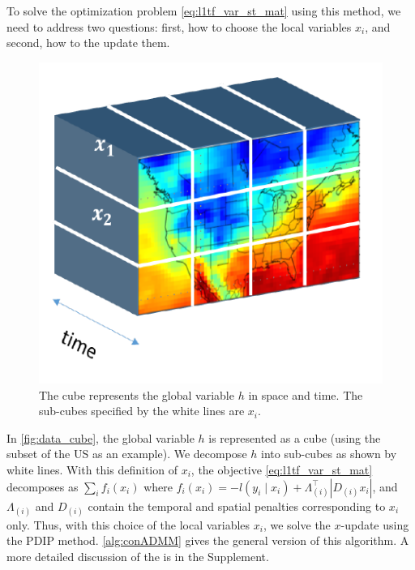 \documentclass{article}
\DeclareMathOperator*{\argmin}{argmin}
\newcommand{\given}{\;\vert\;}
\begin{document}
To solve the optimization problem \eqref{eq:l1tf_var_st_mat} using
this method, we need to address two 
questions: first, how to choose the 
local variables $x_i$, and second, how to the update them.
\begin{figure}[tb]
  \centering
  \includegraphics[height=.2\textheight]{Figures/data_cube}
  \caption{The cube represents the global variable $h$ in space and
    time. The sub-cubes specified by the white lines are
    $x_i$.}
  \label{fig:data_cube}
\end{figure} 


In \autoref{fig:data_cube}, the global variable $h$ is represented
as a cube (using the subset of the US as an example). We decompose $h$
into sub-cubes as shown by white lines. With
this definition of $x_i$, the objective
\eqref{eq:l1tf_var_st_mat} decomposes as $\sum_i f_i(x_i)$ where
$f_i(x_i)=-l(y_i\given x_i)+\Lambda_{(i)}^\top |D_{(i)}x_i|$, and
$\Lambda_{(i)}$ and $D_{(i)}$ contain the temporal and spatial
penalties corresponding to $x_i$ only. 
Thus, with this choice of the local variables $x_i$, we solve the
$x$-update using the PDIP method. 
\autoref{alg:conADMM} gives the general version of this algorithm. A
more detailed discussion of the is in the Supplement. 
\end{document}
